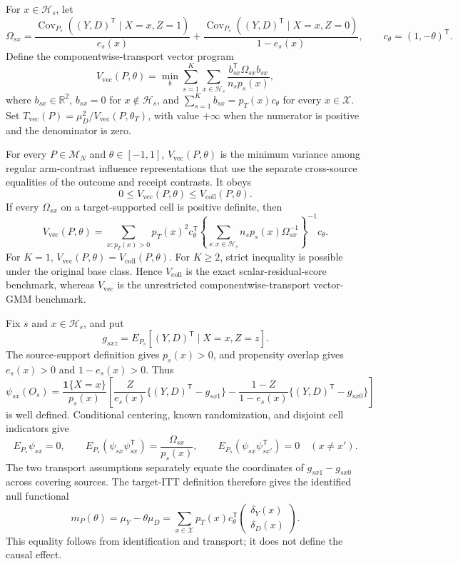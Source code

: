 For \(x\in\mathcal H_s\), let
\[
\Omega_{sx}=
\frac{\operatorname{Cov}_{P_s}((Y,D)^{\mathsf T}\mid X=x,Z=1)}{e_s(x)}
+\frac{\operatorname{Cov}_{P_s}((Y,D)^{\mathsf T}\mid X=x,Z=0)}{1-e_s(x)},
\qquad c_\theta=(1,-\theta)^{\mathsf T}.
\]
Define the componentwise-transport vector program
\[
V_{\mathrm{vec}}(P,\theta)=
\min_b\sum_{s=1}^K\sum_{x\in\mathcal H_s}
\frac{b_{sx}^{\mathsf T}\Omega_{sx}b_{sx}}{n_sp_s(x)},
\]
where \(b_{sx}\in\mathbb R^2\), \(b_{sx}=0\) for \(x\notin\mathcal H_s\), and
\(\sum_{s=1}^K b_{sx}=p_T(x)c_\theta\) for every \(x\in\mathcal X\). Set
\(T_{\mathrm{vec}}(P)=\mu_D^2/V_{\mathrm{vec}}(P,\theta_T)\), with value \(+\infty\) when the numerator is positive and the denominator is zero.

For every \(P\in\mathcal M_N\) and \(\theta\in[-1,1]\), \(V_{\mathrm{vec}}(P,\theta)\) is the minimum variance among regular arm-contrast influence representations that use the separate cross-source equalities of the outcome and receipt contrasts. It obeys
\[
0\le V_{\mathrm{vec}}(P,\theta)\le V_{\mathrm{coll}}(P,\theta).
\]
If every \(\Omega_{sx}\) on a target-supported cell is positive definite, then
\[
V_{\mathrm{vec}}(P,\theta)
=\sum_{x:p_T(x)>0}p_T(x)^2c_\theta^{\mathsf T}
\left\{\sum_{s:x\in\mathcal H_s}n_sp_s(x)\Omega_{sx}^{-1}\right\}^{-1}
c_\theta.
\]
For \(K=1\), \(V_{\mathrm{vec}}(P,\theta)=V_{\mathrm{coll}}(P,\theta)\). For \(K\ge2\), strict inequality is possible under the original base class. Hence \(V_{\mathrm{coll}}\) is the exact scalar-residual-score benchmark, whereas \(V_{\mathrm{vec}}\) is the unrestricted componentwise-transport vector-GMM benchmark.

Fix \(s\) and \(x\in\mathcal H_s\), and put
\[
g_{sxz}=E_{P_s}[(Y,D)^{\mathsf T}\mid X=x,Z=z].
\]
The source-support definition gives \(p_s(x)>0\), and propensity overlap gives \(e_s(x)>0\) and \(1-e_s(x)>0\). Thus
\[
\psi_{sx}(O_s)=\frac{\mathbf 1\{X=x\}}{p_s(x)}
\left[
\frac{Z}{e_s(x)}\{(Y,D)^{\mathsf T}-g_{sx1}\}
-\frac{1-Z}{1-e_s(x)}\{(Y,D)^{\mathsf T}-g_{sx0}\}
\right]
\]
is well defined. Conditional centering, known randomization, and disjoint cell indicators give
\[
E_{P_s}\psi_{sx}=0,\qquad
E_{P_s}(\psi_{sx}\psi_{sx}^{\mathsf T})=\frac{\Omega_{sx}}{p_s(x)},\qquad
E_{P_s}(\psi_{sx}\psi_{sx'}^{\mathsf T})=0\quad(x\ne x').
\]
The two transport assumptions separately equate the coordinates of \(g_{sx1}-g_{sx0}\) across covering sources. The target-ITT definition therefore gives the identified null functional
\[
m_P(\theta)=\mu_Y-\theta\mu_D
=\sum_{x\in\mathcal X}p_T(x)c_\theta^{\mathsf T}
\begin{pmatrix}\delta_Y(x)\\ \delta_D(x)\end{pmatrix}.
\]
This equality follows from identification and transport; it does not define the causal effect.

